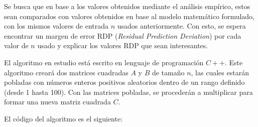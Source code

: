 \documentclass[11pt, twocolumn]{llncs}
\begin{document}
Se busca que en base a los valores obtenidos mediante el análisis empírico, estos sean comparados con valores obtenidos en base al modelo matemático formulado, con los mismos valores de entrada $n$ usados anteriormente. Con esto, se espera encontrar un margen de error RDP (\textit{Residual Prediction Deviation}) por cada valor de $n$ usado y explicar los valores RDP que sean interesantes.

El algoritmo en estudio está escrito en lenguaje de programación $C++$. Este algoritmo creará dos matrices cuadradas $A$ y $B$ de tamaño $n$, las cuales estarán pobladas con números enteros positivos aleatorios dentro de un rango definido (desde 1 hasta 100). Con las matrices pobladas, se procederán a multiplicar para formar una nueva matriz cuadrada $C$.

El código del algoritmo es el siguiente:
\end{document}
